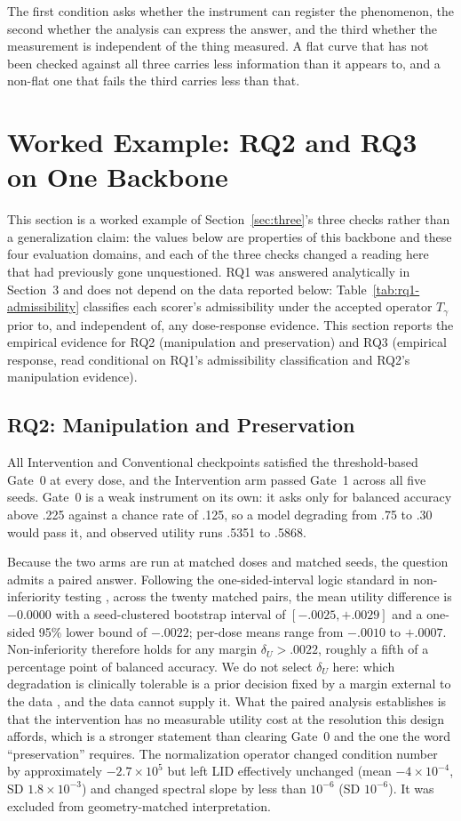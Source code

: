 \documentclass[11pt,a4paper]{article}
\begin{document}
The first condition asks whether the instrument can register the phenomenon,
the second whether the analysis can express the answer, and the third whether
the measurement is independent of the thing measured. A flat curve that has not
been checked against all three carries less information than it appears to, and
a non-flat one that fails the third carries less than that.

\section{Worked Example: RQ2 and RQ3 on One Backbone}
This section is a worked example of Section~\ref{sec:three}'s three checks
rather than a generalization claim: the values below are properties of this
backbone and these four evaluation domains, and each of the three checks
changed a reading here that had previously gone unquestioned.
RQ1 was answered analytically in Section~3 and does not depend on the data reported below: Table~\ref{tab:rq1-admissibility} classifies each scorer's admissibility under the accepted operator $T_\gamma$ prior to, and independent of, any dose-response evidence. This section reports the empirical evidence for RQ2 (manipulation and preservation) and RQ3 (empirical response, read conditional on RQ1's admissibility classification and RQ2's manipulation evidence).
\subsection{RQ2: Manipulation and Preservation}
\label{sec:rq2-manipulation}
All Intervention and Conventional checkpoints satisfied the threshold-based Gate~0 at every dose, and the Intervention arm passed Gate~1 across all five seeds. Gate~0 is a weak instrument on its own: it asks only for balanced accuracy above .225 against a chance rate of .125, so a model degrading from .75 to .30 would pass it, and observed utility runs .5351 to .5868.

Because the two arms are run at matched doses and matched seeds, the question admits a paired answer. Following the one-sided-interval logic standard in non-inferiority testing \cite{b24}, across the twenty matched pairs, the mean utility difference is $-0.0000$ with a seed-clustered bootstrap interval of $[-.0025,+.0029]$ and a one-sided 95\% lower bound of $-.0022$; per-dose means range from $-.0010$ to $+.0007$. Non-inferiority therefore holds for any margin $\delta_U>.0022$, roughly a fifth of a percentage point of balanced accuracy. We do not select $\delta_U$ here: which degradation is clinically tolerable is a prior decision fixed by a margin external to the data \cite{b24}, and the data cannot supply it. What the paired analysis establishes is that the intervention has no measurable utility cost at the resolution this design affords, which is a stronger statement than clearing Gate~0 and the one the word ``preservation'' requires. The normalization operator changed condition number by approximately $-2.7\times10^{5}$ but left LID effectively unchanged (mean $-4\times10^{-4}$, SD $1.8\times10^{-3}$) and changed spectral slope by less than $10^{-6}$ (SD $10^{-6}$). It was excluded from geometry-matched interpretation.
\end{document}
